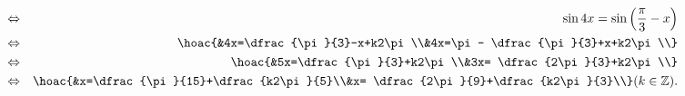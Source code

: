 \begin{bt}
{\begin{enumerate}
\begin{eqnarray*}
				&\Leftrightarrow& \sin 4x = \sin \left(\dfrac{\pi}{3}-x\right)\\
				&\Leftrightarrow& \hoac{&4x=\dfrac{\pi}{3}-x+k2\pi\\&4x=\pi - \dfrac{\pi}{3}+x+k2\pi\\}\\
				&\Leftrightarrow& \hoac{&5x=\dfrac{\pi}{3}+k2\pi\\&3x= \dfrac{2\pi}{3}+k2\pi\\}\\
				&\Leftrightarrow& \hoac{&x=\dfrac{\pi}{15}+\dfrac{k2\pi}{5}\\&x= \dfrac{2\pi}{9}+\dfrac{k2\pi}{3}\\} (k\in \mathbb{Z}).
			\end{eqnarray*}
		\end{enumerate}
		
	}
\end{bt}


